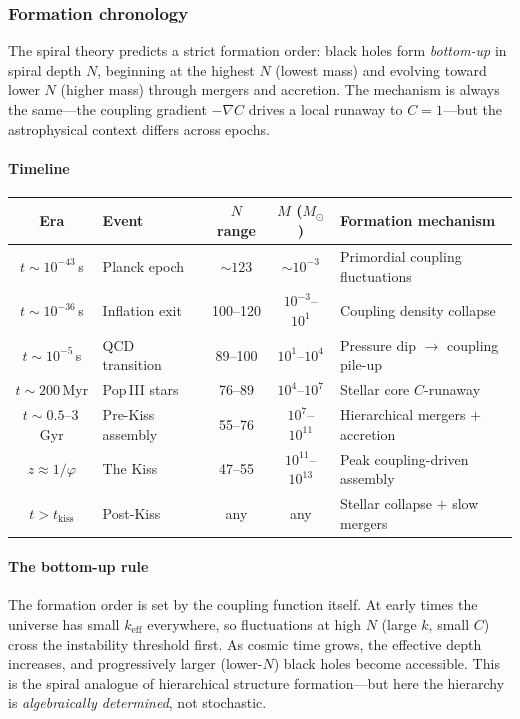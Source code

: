 \documentclass[12pt,a4paper]{article}
\begin{document}
\subsubsection{Formation chronology}
\label{sec:bh-chronology}

The spiral theory predicts a strict formation order: black holes form \emph{bottom-up} in spiral depth $N$, beginning at the highest $N$ (lowest mass) and evolving toward lower $N$ (higher mass) through mergers and accretion.  The mechanism is always the same---the coupling gradient $-\nabla C$ drives a local runaway to $C = 1$---but the astrophysical context differs across epochs.

\paragraph{Timeline}

\begin{center}\small
\begin{tabular}{@{}clccp{3.8cm}@{}}
\toprule
Era & Event & $N$ range & $M$ ($M_\odot$) & Formation mechanism \\
\midrule
$t\sim 10^{-43}$\,s & Planck epoch & $\sim 123$ & $\sim 10^{-3}$ & Primordial coupling fluctuations \\
$t\sim 10^{-36}$\,s & Inflation exit & 100--120 & $10^{-3}$--$10^{1}$ & Coupling density collapse \\
$t\sim 10^{-5}$\,s & QCD transition & 89--100 & $10^{1}$--$10^{4}$ & Pressure dip $\to$ coupling pile-up \\
$t\sim 200$\,Myr & Pop\,III stars & 76--89 & $10^{4}$--$10^{7}$ & Stellar core $C$-runaway \\
$t\sim 0.5$--$3$\,Gyr & Pre-Kiss assembly & 55--76 & $10^{7}$--$10^{11}$ & Hierarchical mergers $+$ accretion \\
$z\approx 1/\varphi$ & The Kiss & 47--55 & $10^{11}$--$10^{13}$ & Peak coupling-driven assembly \\
$t> t_{\mathrm{kiss}}$ & Post-Kiss & any & any & Stellar collapse $+$ slow mergers \\
\bottomrule
\end{tabular}
\end{center}

\paragraph{The bottom-up rule}

The formation order is set by the coupling function itself.  At early times the universe has small $k_{\mathrm{eff}}$ everywhere, so fluctuations at high $N$ (large $k$, small $C$) cross the instability threshold first.  As cosmic time grows, the effective depth increases, and progressively larger (lower-$N$) black holes become accessible.  This is the spiral analogue of hierarchical structure formation---but here the hierarchy is \emph{algebraically determined}, not stochastic.
\end{document}
